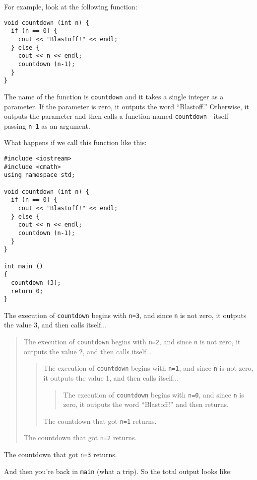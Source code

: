 For example, look at the following function:

\begin{lstlisting}
void countdown (int n) {
  if (n == 0) {
    cout << "Blastoff!" << endl;
  } else {
    cout << n << endl;
    countdown (n-1);
  }
}
\end{lstlisting}
%
The name of the function is {\tt countdown} and it takes a single
integer as a parameter.  If the parameter is zero, it outputs
the word ``Blastoff.''  Otherwise, it outputs the parameter and
then calls a function named {\tt countdown}---itself---passing
{\tt n-1} as an argument.

What happens if we call this function like this:

\begin{lstlisting}
#include <iostream>
#include <cmath>
using namespace std;

void countdown (int n) {
  if (n == 0) {
    cout << "Blastoff!" << endl;
  } else {
    cout << n << endl;
    countdown (n-1);
  }
}

int main ()
{
  countdown (3);
  return 0;
}
\end{lstlisting}
%
The execution of {\tt countdown} begins with {\tt n=3}, and
since {\tt n} is not zero, it outputs the value 3, and then
calls itself...

\begin{quote}
The execution of {\tt countdown} begins with {\tt n=2}, and
since {\tt n} is not zero, it outputs the value 2, and then
calls itself...

\begin{quote}
The execution of {\tt countdown} begins with {\tt n=1}, and
since {\tt n} is not zero, it outputs the value 1, and then
calls itself...

\begin{quote}
The execution of {\tt countdown} begins with {\tt n=0}, and
since {\tt n} is zero, it outputs the word ``Blastoff!''
and then returns.
\end{quote}

The countdown that got {\tt n=1} returns.

\end{quote}

The countdown that got {\tt n=2} returns.

\end{quote}

The countdown that got {\tt n=3} returns.

\noindent And then you're back in {\tt main} (what a trip).  So the
total output looks like:

